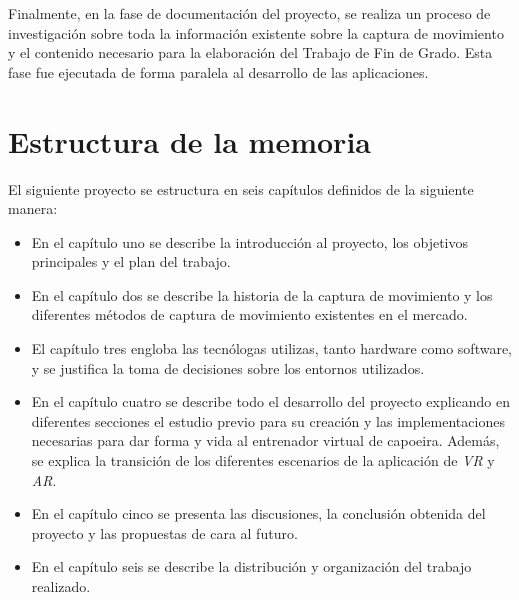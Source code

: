 Finalmente, en la fase de documentación del proyecto, se realiza un proceso de investigación sobre toda la información existente sobre la captura de movimiento y el contenido necesario para la elaboración del Trabajo de Fin de Grado. Esta fase fue ejecutada de forma paralela al desarrollo de las aplicaciones.


\section{Estructura de la memoria}

El siguiente proyecto se estructura en seis capítulos definidos de la siguiente manera:

\begin{itemize}
	\item En el capítulo uno se describe la introducción al proyecto, los objetivos principales y el plan del trabajo.
	\item En el capítulo dos se describe la historia de la captura de movimiento y los diferentes métodos de captura de movimiento existentes en el mercado.
	\item El capítulo tres engloba las tecnólogas utilizas, tanto hardware como software, y se justifica la toma de decisiones sobre los entornos utilizados. 
	\item En el capítulo cuatro se describe todo el desarrollo del proyecto explicando en diferentes secciones el estudio previo para su creación y las implementaciones necesarias para dar forma y vida al entrenador virtual de capoeira. Además, se explica la transición de los diferentes escenarios de la aplicación de \textit{VR} y \textit{AR}.
	\item En el capítulo cinco se presenta las discusiones, la conclusión obtenida del proyecto y las propuestas de cara al futuro.
	\item En el capítulo seis se describe la distribución y organización del trabajo realizado.
\end{itemize}

